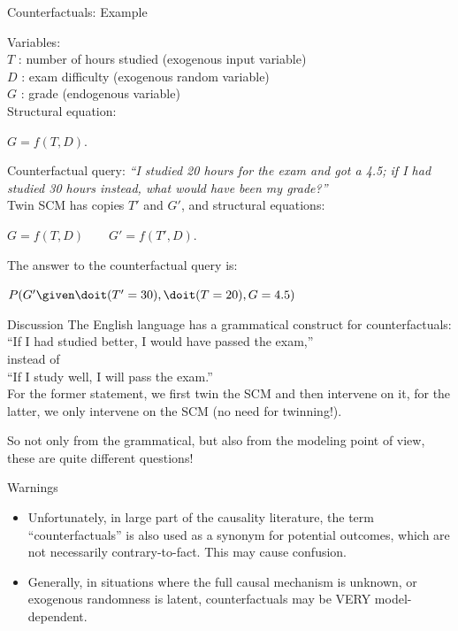 \begin{frame}{Counterfactuals: Example}
  \begin{example}
  Variables:\\
    \quad $T$ : number of hours studied (exogenous input variable)\\
    \quad $D$ : exam difficulty (exogenous random variable)\\
    \quad $G$ : grade (endogenous variable)\\
  Structural equation:\\
  \smallskip
  \centerline{$G = f(T,D).$}
  \smallskip
  Counterfactual query: {\it ``I studied 20 hours for the exam and
got a 4.5; if I had studied 30 hours instead, what would have been my grade?''}\\

    \medskip
    Twin SCM has copies $T'$ and $G'$, and structural equations:\\
    \smallskip
    \centerline{$G = f(T,D) \qquad G' = f(T',D).$}
    \smallskip
    The answer to the counterfactual query is:\\
    \smallskip
    \centerline{$P(G' \given \doit(T'=30), \doit(T=20), G=4.5)$}
    \smallskip
  \end{example}
\end{frame}

\begin{frame}{Discussion}
The English language has a grammatical construct for counterfactuals:\\
\quad ``If I had studied better, I would have passed the exam,''\\
instead of\\
\quad ``If I study well, I will pass the exam.''\\
For the former statement, we first twin the SCM and then intervene on it, for the latter, we only intervene on the SCM (no need for twinning!). 

\bigskip
So not only from the grammatical, but also from the modeling point of view, these are quite different questions!

\bigskip
{}
  \begin{block}{Warnings}
    \begin{itemize}
      \item
  Unfortunately, in large part of the causality literature, the term ``counterfactuals'' is also used 
  as a synonym for potential outcomes, which are not necessarily contrary-to-fact. This may
  cause confusion.
\item Generally, in situations where the full causal mechanism is unknown, or exogenous
randomness is latent, counterfactuals may be VERY model-dependent.
    \end{itemize}
  \end{block}
\end{frame}


